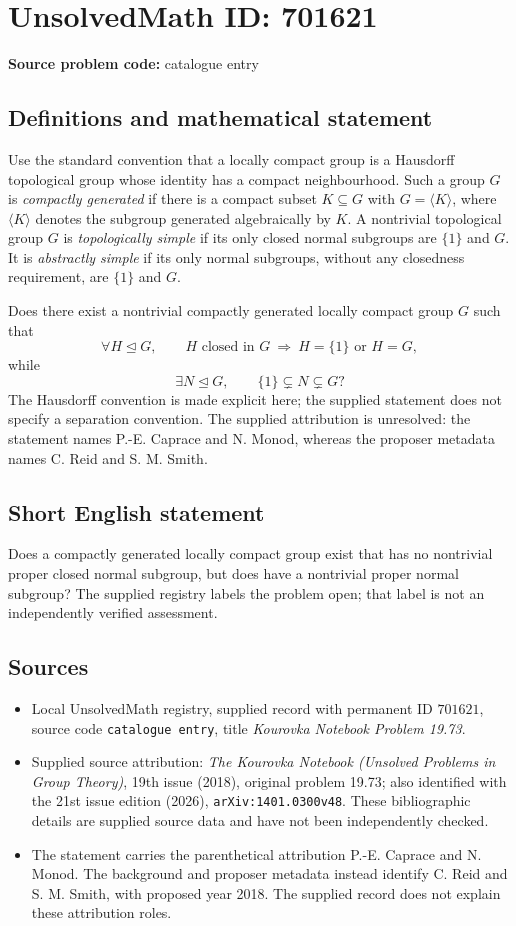 \documentclass[11pt]{article}
\begin{document}
\section*{UnsolvedMath ID: 701621}
\textbf{Source problem code:} catalogue entry
\subsection{Definitions and mathematical statement}
Use the standard convention that a locally compact group is a Hausdorff topological group whose identity has a compact neighbourhood. Such a group \(G\) is \emph{compactly generated} if there is a compact subset \(K\subseteq G\) with \(G=\langle K\rangle\), where \(\langle K\rangle\) denotes the subgroup generated algebraically by \(K\). A nontrivial topological group \(G\) is \emph{topologically simple} if its only closed normal subgroups are \(\{1\}\) and \(G\). It is \emph{abstractly simple} if its only normal subgroups, without any closedness requirement, are \(\{1\}\) and \(G\).

Does there exist a nontrivial compactly generated locally compact group \(G\) such that
\[
\forall H\trianglelefteq G,\qquad H\text{ closed in }G\ \Longrightarrow\ H=\{1\}\text{ or }H=G,
\]
while
\[
\exists N\trianglelefteq G,\qquad \{1\}\subsetneq N\subsetneq G?
\]
The Hausdorff convention is made explicit here; the supplied statement does not specify a separation convention. The supplied attribution is unresolved: the statement names P.-E. Caprace and N. Monod, whereas the proposer metadata names C. Reid and S. M. Smith.
\subsection{Short English statement}
Does a compactly generated locally compact group exist that has no nontrivial proper closed normal subgroup, but does have a nontrivial proper normal subgroup? The supplied registry labels the problem open; that label is not an independently verified assessment.
\subsection{Sources}
\begin{itemize}
\item Local UnsolvedMath registry, supplied record with permanent ID \(701621\), source code \texttt{catalogue entry}, title \emph{Kourovka Notebook Problem 19.73}.
\item Supplied source attribution: \emph{The Kourovka Notebook (Unsolved Problems in Group Theory)}, 19th issue (2018), original problem 19.73; also identified with the 21st issue edition (2026), \texttt{arXiv:1401.0300v48}. These bibliographic details are supplied source data and have not been independently checked.
\item The statement carries the parenthetical attribution P.-E. Caprace and N. Monod. The background and proposer metadata instead identify C. Reid and S. M. Smith, with proposed year 2018. The supplied record does not explain these attribution roles.
\end{itemize}
\end{document}
